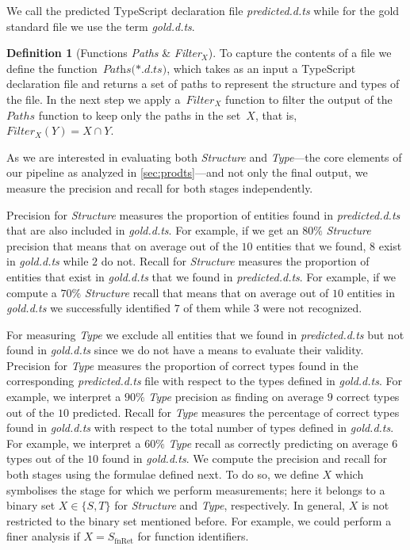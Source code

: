 \documentclass[sigplan,10pt,anonymous]{acmart} %
\theoremstyle{plain}
\theoremstyle{remark}
\theoremstyle{definition}
\newtheorem{defn}{Definition}[section]
\begin{document}
We call the predicted TypeScript declaration file
\emph{predicted.d.ts} while for the gold standard file we use the term
\emph{gold.d.ts}.

\begin{defn}[Functions \textit{Paths} \& \textit{Filter$_X$}]
  To capture the contents of a file we define the
  function~$\textit{Paths(*.d.ts)}$, which takes as an input a
  TypeScript declaration file and returns a set of paths
  to represent the structure and types of the file.
  In the next step we apply a~$Filter_X$ function to
  filter the output of the~$Paths$ function to keep only the paths in the set~$X$,
  that is,~$Filter_X(Y) =  X \cap Y$.
\end{defn}

As we are interested in evaluating both \textit{Structure} and \textit{Type}---the core elements of our pipeline as analyzed in \cref{sec:prodts}---and not only the final output, we measure the precision and recall for both stages independently.

Precision for \textit{Structure} measures the proportion of entities found in \textit{predicted.d.ts} that are also included in \textit{gold.d.ts}.
For example, if we get an $80\%$ \textit{Structure} precision that means that on average out of the $10$ entities that we found, $8$ exist in \textit{gold.d.ts} while $2$ do not.
Recall for \textit{Structure} measures the proportion of entities that exist in \textit{gold.d.ts} that we found in \textit{predicted.d.ts}.
For example, if we compute a $70\%$ \textit{Structure} recall that means that on average out of $10$ entities in \textit{gold.d.ts} we successfully identified $7$ of them while $3$ were not recognized.

For measuring \textit{Type} we exclude all entities that we found in \textit{predicted.d.ts} but not found in \textit{gold.d.ts} since we do not have a means to evaluate their validity.
Precision for \textit{Type} measures the proportion of correct types found in the corresponding \textit{predicted.d.ts} file with respect to the types defined in \textit{gold.d.ts}.
For example, we interpret a $90\%$ \textit{Type} precision as finding on average $9$ correct types out of the $10$ predicted.
Recall for \textit{Type} measures the percentage of correct types found in \textit{gold.d.ts} with respect to the total number of types defined in \textit{gold.d.ts}.
For example, we interpret a $60\%$ \textit{Type} recall as correctly predicting on average $6$ types out of the $10$ found in \textit{gold.d.ts}.
We compute the precision and recall for both stages using the formulae defined next.
To do so, we define $X$ which symbolises the stage for which we perform measurements; here it belongs to a binary set $X \in \{S, T\}$ for \textit{Structure} and \textit{Type}, respectively.
In general, $X$ is not restricted to the binary set mentioned before.
For example, we could perform a finer analysis if $X = S_\text{fnRet}$ for function identifiers.
\end{document}
